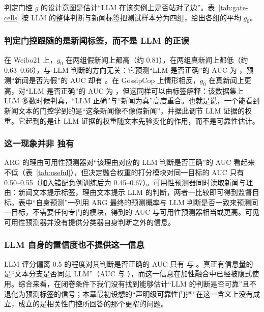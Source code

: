 判定门控 $g$ 的设计意图是估计“LLM 在该实例上是否站对了边”。表~\ref{tab:gate-cells} 按 LLM 的整体判断与新闻标签把测试样本分为四组，给出各组的平均 $g_0$。

\begin{table}[htbp]
\centering\small
\caption{判定门控在整体实例上的取值}\label{tab:gate-cells}
\end{table}

\subsubsection{判定门控跟随的是新闻标签，而不是 LLM 的正误}
在 Weibo21 上，$g_0$ 在两组假新闻上都高（约 0.81），在两组真新闻上都低（约 0.63--0.66），与 LLM 判断的方向无关：它预测“LLM 是否正确”的 AUC 为 ，预测“新闻是否为假”的 AUC 却有 。在 GossipCop 上情形相反，$g_0$ 在真新闻上更高，对“LLM 是否正确”的 AUC 为 ，但这同样可以由标签解释：该数据集上 LLM 多数时候判真，“LLM 正确”与“新闻为真”高度重合。也就是说，一个能看到新闻文本的门控学到的是“这条新闻像不像假新闻”，并据此调节 LLM 证据的权重。它起到的是让 LLM 证据的权重随文本先验变化的作用，而不是可靠性估计。

\subsubsection{这一现象并非 \method{} 独有}
ARG 的理由可用性预测器对“该理由对应的 LLM 判断是否正确”的 AUC 看起来不低（表~\ref{tab:useful}），但决定融合权重的打分模块对同一目标的 AUC 只有 0.50--0.55（加入错配负例训练后为 0.45--0.67）。可用性预测器同时读取新闻与理由：新闻文本提示标签，理由文本提示 LLM 的判断，两者一比较即可得到监督目标。表中“自身预测”一列用 ARG 最终的预测概率与 LLM 判断是否一致来预测同一目标，不需要任何专门的模块，得到的 AUC 与可用性预测器相当或更高。可见可用性预测器并没有提供分类器自身判断之外的信息。

\begin{table}[htbp]
\centering\small
\caption{对“该理由对应的 LLM 判断是否正确”的 AUC}\label{tab:useful}
\end{table}

\subsubsection{LLM 自身的置信度也不提供这一信息}
LLM 评分偏离 0.5 的程度对其判断是否正确的 AUC 只有  与 。真正有信息量的是“文本分支是否同意 LLM”（AUC  与 ），而这一信息在加性融合中已经被隐式使用。综合来看，在闭卷条件下我们没有找到能够估计“LLM 的判断是否可靠”且不退化为预测标签的信号；本章最初设想的“声明级可靠性门控”在这一含义上没有成立，成立的是相关性门控所回答的那个更窄的问题。

